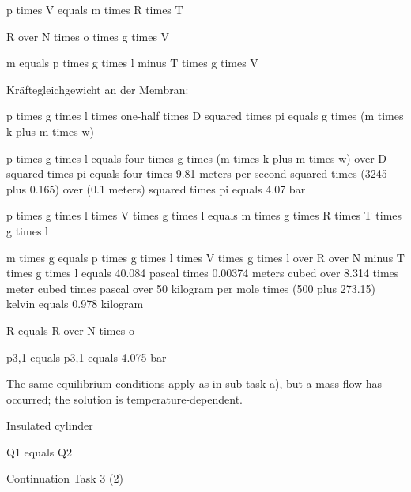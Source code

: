 p times V equals m times R times T

R over N times o times g times V

m equals p times g times l minus T times g times V

Kräftegleichgewicht an der Membran:

p times g times l times one-half times D squared times pi equals g times (m times k plus m times w)

p times g times l equals four times g times (m times k plus m times w) over D squared times pi equals four times 9.81 meters per second squared times (3245 plus 0.165) over (0.1 meters) squared times pi equals 4.07 bar

p times g times l times V times g times l equals m times g times R times T times g times l

m times g equals p times g times l times V times g times l over R over N minus T times g times l equals 40.084 pascal times 0.00374 meters cubed over 8.314 times meter cubed times pascal over 50 kilogram per mole times (500 plus 273.15) kelvin equals 0.978 kilogram

R equals R over N times o

p3,1 equals p3,1 equals 4.075 bar

The same equilibrium conditions apply as in sub-task a), but a mass flow has occurred; the solution is temperature-dependent.

Insulated cylinder

Q1 equals Q2

Continuation Task 3 (2)